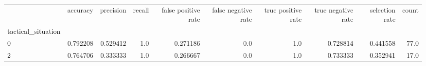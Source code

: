 \begin{tabular}{lrrrrrrrrr}
\toprule
{} &  accuracy &  precision &  recall &  false positive rate &  false negative rate &  true positive rate &  true negative rate &  selection rate &  count \\
tactical\_situation &           &            &         &                      &                      &                     &                     &                 &        \\
\midrule
0                  &  0.792208 &   0.529412 &     1.0 &             0.271186 &                  0.0 &                 1.0 &            0.728814 &        0.441558 &   77.0 \\
2                  &  0.764706 &   0.333333 &     1.0 &             0.266667 &                  0.0 &                 1.0 &            0.733333 &        0.352941 &   17.0 \\
\bottomrule
\end{tabular}
